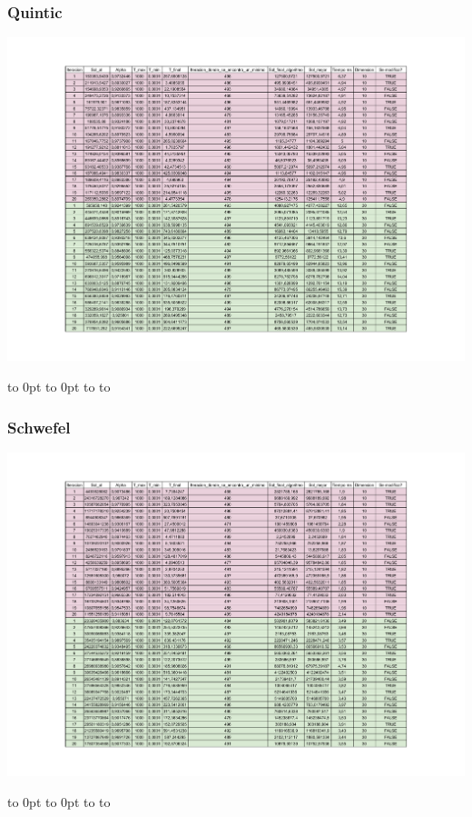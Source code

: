\documentclass[10pt]{article}
\def\fillandplacepagenumber{%
 \par\pagestyle{empty}%
 \vbox to 0pt{\vss}\vfill
 \vbox to 0pt{\baselineskip0pt
   \hbox to\linewidth{\hss}%
   \baselineskip\footskip
   \hbox to\linewidth{%
     \hfil\thepage\hfil}\vss}}
\begin{document}
\begin{landscape}
  \subsubsection{Quintic}
  \begin{center}
    \includegraphics[scale=0.7]{docs/RMHC_SA_Metaheuristics-SA_Quintic.pdf}
  \end{center}
  \fillandplacepagenumber
  \subsubsection{Schwefel}
  \begin{center}
    \includegraphics[scale=0.7]{docs/RMHC_SA_Metaheuristics-SA_Schwefel.pdf}
  \end{center}
  \fillandplacepagenumber

\end{landscape}
\end{document}
